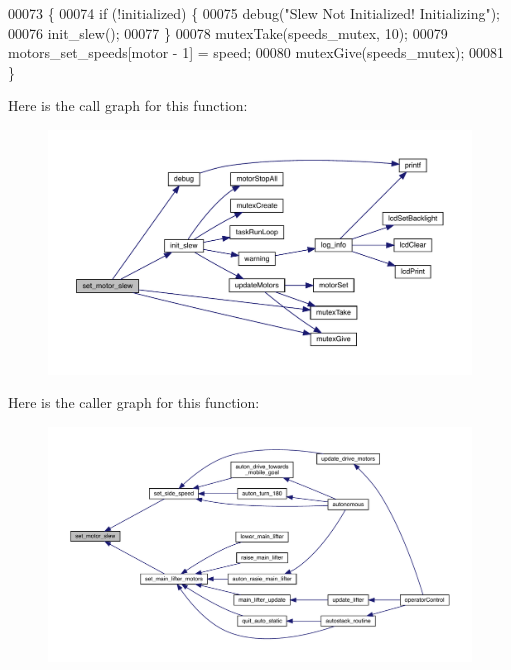 \begin{DoxyCode}
00073                                           \{
00074   \textcolor{keywordflow}{if} (!initialized) \{
00075     debug(\textcolor{stringliteral}{"Slew Not Initialized! Initializing"});
00076     init_slew();
00077   \}
00078   mutexTake(speeds_mutex, 10);
00079   motors_set_speeds[motor - 1] = speed;
00080   mutexGive(speeds_mutex);
00081 \}
\end{DoxyCode}
Here is the call graph for this function\+:
\nopagebreak
\begin{figure}[H]
\begin{center}
\leavevmode
\includegraphics[width=350pt]{slew_8h_a7dff2b79dffe55fb936d977594d7c01d_cgraph}
\end{center}
\end{figure}
Here is the caller graph for this function\+:
\nopagebreak
\begin{figure}[H]
\begin{center}
\leavevmode
\includegraphics[width=350pt]{slew_8h_a7dff2b79dffe55fb936d977594d7c01d_icgraph}
\end{center}
\end{figure}
\mbox{\label{slew_8h_a807a87c5df438fde21c1e8213906695b}} 
